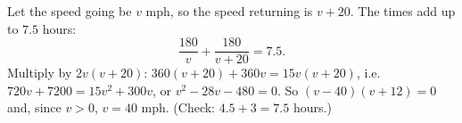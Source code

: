 Let the speed going be $v$ mph, so the speed returning is $v+20$. The times add up to $7.5$ hours:
\[
\dfrac{180}{v}+\dfrac{180}{v+20}=7.5 .
\]
Multiply by $2v(v+20)$: $360(v+20)+360v=15v(v+20)$, i.e. $720v+7200=15v^2+300v$, or $v^2-28v-480=0$. So $(v-40)(v+12)=0$ and, since $v>0$, $v=\boxed{40}$ mph. (Check: $4.5+3=7.5$ hours.)
